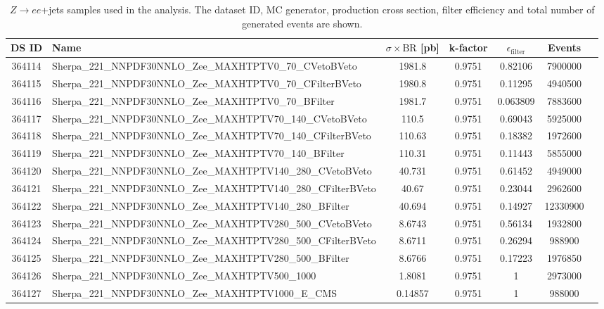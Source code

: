 \begin{landscape}
\begin{table}[!htb]
	\caption{$Z \to ee$+jets samples used in the analysis. The dataset ID, MC generator, production cross section, filter efficiency and total number of generated events are shown.}
	\label{tabular:mc_samples_Zeejets}
	\begin{footnotesize}
		\begin{center}
			\begin{tabular}{|c|l|c|c|c|c|r|}
				\hline
				DS ID & Name & $\sigma\times\text{BR}$ [pb] & k-factor & $\epsilon_{\text{filter}}$ & Events \\ \hline
				364114 & Sherpa\_221\_NNPDF30NNLO\_Zee\_MAXHTPTV0\_70\_CVetoBVeto & 1981.8 & 0.9751 & 0.82106 & 7900000 \\
				364115 & Sherpa\_221\_NNPDF30NNLO\_Zee\_MAXHTPTV0\_70\_CFilterBVeto & 1980.8 & 0.9751 & 0.11295 & 4940500 \\
				364116 & Sherpa\_221\_NNPDF30NNLO\_Zee\_MAXHTPTV0\_70\_BFilter & 1981.7 & 0.9751 & 0.063809 & 7883600 \\
				364117 & Sherpa\_221\_NNPDF30NNLO\_Zee\_MAXHTPTV70\_140\_CVetoBVeto & 110.5 & 0.9751 & 0.69043 & 5925000 \\
				364118 & Sherpa\_221\_NNPDF30NNLO\_Zee\_MAXHTPTV70\_140\_CFilterBVeto & 110.63 & 0.9751 & 0.18382 & 1972600 \\
				364119 & Sherpa\_221\_NNPDF30NNLO\_Zee\_MAXHTPTV70\_140\_BFilter & 110.31 & 0.9751 & 0.11443 & 5855000 \\
				364120 & Sherpa\_221\_NNPDF30NNLO\_Zee\_MAXHTPTV140\_280\_CVetoBVeto & 40.731 & 0.9751 & 0.61452 & 4949000 \\
				364121 & Sherpa\_221\_NNPDF30NNLO\_Zee\_MAXHTPTV140\_280\_CFilterBVeto & 40.67 & 0.9751 & 0.23044 & 2962600 \\
				364122 & Sherpa\_221\_NNPDF30NNLO\_Zee\_MAXHTPTV140\_280\_BFilter & 40.694 & 0.9751 & 0.14927 & 12330900 \\
				364123 & Sherpa\_221\_NNPDF30NNLO\_Zee\_MAXHTPTV280\_500\_CVetoBVeto & 8.6743 & 0.9751 & 0.56134 & 1932800 \\
				364124 & Sherpa\_221\_NNPDF30NNLO\_Zee\_MAXHTPTV280\_500\_CFilterBVeto & 8.6711 & 0.9751 & 0.26294 & 988900 \\
				364125 & Sherpa\_221\_NNPDF30NNLO\_Zee\_MAXHTPTV280\_500\_BFilter & 8.6766 & 0.9751 & 0.17223 & 1976850 \\
				364126 & Sherpa\_221\_NNPDF30NNLO\_Zee\_MAXHTPTV500\_1000 & 1.8081 & 0.9751 & 1 & 2973000 \\
				364127 & Sherpa\_221\_NNPDF30NNLO\_Zee\_MAXHTPTV1000\_E\_CMS & 0.14857 & 0.9751 & 1 & 988000 \\
				\hline
			\end{tabular}
		\end{center}
	\end{footnotesize}
\end{table}


\end{landscape}
